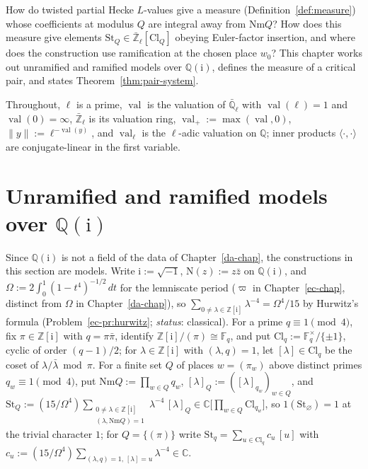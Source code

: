 \documentclass[reqno]{amsart}
\newcounter{chap}
\theoremstyle{definition}
\theoremstyle{plain}
\theoremstyle{remark}
\newcommand{\Z}{\mathbb{Z}}
\newcommand{\Q}{\mathbb{Q}}
\newcommand{\C}{\mathbb{C}}
\newcommand{\F}{\mathbb{F}}
\newcommand{\Ql}{\bar{\mathbb{Q}}_\ell}
\newcommand{\Zl}{\bar{\mathbb{Z}}_\ell}
\newcommand{\ii}{\mathrm{i}}
\newcommand{\St}{\mathrm{St}}
\newcommand{\Cl}{\mathrm{Cl}}
\newcommand{\Nm}{\mathrm{Nm}}
\newcommand{\val}{\operatorname{val}}
\begin{document}
How do twisted partial Hecke \(L\)-values give a measure (Definition~\ref{def:measure}) whose coefficients at modulus \(Q\) are integral away from \(\Nm Q\)?  How does this measure give elements \(\St_Q \in \Zl[\Cl_Q]\) obeying Euler-factor insertion, and where does the construction use ramification at the chosen place \(w_0\)?  This chapter works out unramified and ramified models over \(\Q(\ii)\), defines the measure of a critical pair, and states Theorem~\ref{thm:pair-system}.

Throughout, \(\ell\) is a prime, \(\val\) is the valuation of \(\Ql\) with \(\val(\ell) = 1\) and \(\val(0) = \infty\), \(\Zl\) is its valuation ring, \(\val_+ := \max(\val, 0)\), \(\lVert y\rVert := \ell^{-\val(y)}\), and \(\val_\ell\) is the \(\ell\)-adic valuation on \(\Q\); inner products \(\langle\cdot, \cdot\rangle\) are conjugate-linear in the first variable.

\section{Unramified and ramified models over \texorpdfstring{\(\Q(\ii)\)}{Q(i)}}\label{sec:models}

Since \(\Q(\ii)\) is not a field of the data of Chapter~\ref{da-chap}, the constructions in this section are models.  Write \(\ii := \sqrt{-1}\), \(\mathrm{N}(z) := z\bar z\) on \(\Q(\ii)\), and \(\Omega := 2\int_0^1 (1 - t^4)^{-1/2}\,dt\) for the lemniscate period (\(\varpi\) in Chapter~\ref{ec-chap}, distinct from \(\Omega\) in Chapter~\ref{da-chap}), so \(\sum_{0 \ne \lambda \in \Z[\ii]} \lambda^{-4} = \Omega^4/15\) by Hurwitz's formula (Problem~\ref{ec-pr:hurwitz}; \emph{status}: classical).  For a prime \(q \equiv 1 \pmod 4\), fix \(\pi \in \Z[\ii]\) with \(q = \pi\bar\pi\), identify \(\Z[\ii]/(\pi) \cong \F_q\), and put \(\Cl_q := \F_q^\times / \{\pm 1\}\), cyclic of order \((q-1)/2\); for \(\lambda \in \Z[\ii]\) with \((\lambda, q) = 1\), let \([\lambda] \in \Cl_q\) be the coset of \(\lambda/\bar\lambda \bmod \pi\).  For a finite set \(Q\) of places \(w = (\pi_w)\) above distinct primes \(q_w \equiv 1 \pmod 4\), put \(\Nm Q := \prod_{w \in Q} q_w\), \([\lambda]_Q := ([\lambda]_{q_w})_{w \in Q}\), and \(\St_Q := (15/\Omega^4) \sum_{\substack{0 \ne \lambda \in \Z[\ii] \\ (\lambda, \Nm Q) = 1}} \lambda^{-4}\,[\lambda]_Q \in \C\bigl[\prod_{w \in Q} \Cl_{q_w}\bigr]\), so \(1(\St_\varnothing) = 1\) at the trivial character \(1\); for \(Q = \{(\pi)\}\) write \(\St_q = \sum_{u \in \Cl_q} c_u\,[u]\) with \(c_u := (15/\Omega^4) \sum_{(\lambda, q) = 1,\, [\lambda] = u} \lambda^{-4} \in \C\).
\end{document}
